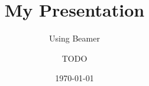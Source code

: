 \documentclass{beamer}
\title{My Presentation}
\subtitle{Using Beamer}
\author{TODO}
\institute{UBC}
\date{\today}
\begin{document}
\begin{frame}
\titlepage
\end{frame}



\end{document}
